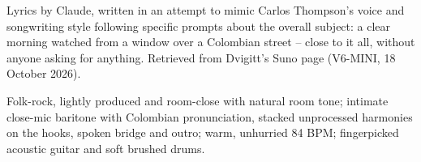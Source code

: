 
\begin{notes}
Lyrics by Claude, written in an attempt to mimic Carlos Thompson's voice and songwriting style following specific prompts about the overall subject: a clear morning watched from a window over a Colombian street -- close to it all, without anyone asking for anything. Retrieved from Dvigitt's Suno page (V6-MINI, 18 October 2026).
\end{notes}
\begin{style}
Folk-rock, lightly produced and room-close with natural room tone; intimate close-mic baritone with Colombian pronunciation, stacked unprocessed harmonies on the hooks, spoken bridge and outro; warm, unhurried 84 BPM; fingerpicked acoustic guitar and soft brushed drums.
\end{style}

